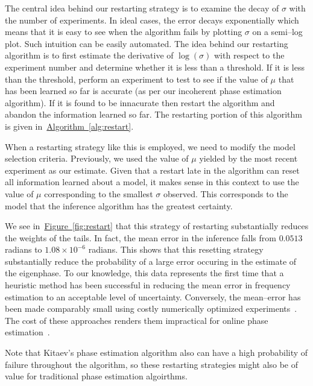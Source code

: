 \documentclass[aps,pra,amsmath,twocolumn,amssymb,superscriptaddress]{revtex4-1}
\newcommand{\fig}[1]{\hyperref[fig:#1]{Figure~\ref*{fig:#1}}}
\newcommand{\alg}[1]{\hyperref[alg:#1]{Algorithm~\ref*{alg:#1}}}
\begin{document}
The central idea behind our restarting strategy is to examine the decay of $\sigma$ with the number of experiments.  In ideal cases, the error decays exponentially which means that it is easy to see when the algorithm fails by plotting $\sigma$ on a semi--log plot.  Such intuition can be easily automated.  The idea behind our restarting algorithm is to first estimate the derivative of $\log(\sigma)$ with respect to the experiment number and determine whether it is less than a threshold.  If it is less than the threshold, perform an experiment to test to see if the value of $\mu$ that has been learned so far is accurate (as per our incoherent phase estimation algorithm).  If it is found to be innacurate then restart the algorithm and abandon the information learned so far.  The restarting portion of this algorithm is given in~\alg{restart}.

When a restarting strategy like this is employed, we need to modify the model selection criteria.  Previously, we used the value of $\mu$ yielded by the most recent experiment as our estimate.   Given that a restart late in the algorithm can reset all information learned about a model, it makes sense in this context to use the value of $\mu$ corresponding to the smallest $\sigma$ observed.  This corresponds to the model that the inference algorithm has the greatest certainty.

We see in~\fig{restart} that this strategy of restarting substantially reduces the weights of the tails.  In fact, the mean error in the inference falls from $0.0513$ radians to $1.08\times 10^{-6}$ radians.  This shows that this resetting strategy substantially reduce the probability of a large error occuring in the estimate of the eigenphase.  To our knowledge, this data represents the first time that a heuristic method has been successful in reducing the mean error in frequency estimation to an acceptable level of uncertainty.
Conversely,  the mean--error has been made comparably small using costly numerically optimized experiments~\cite{granade_robust_2012,ferrie_how_2013}.  The cost of these approaches renders them impractical for online phase estimation~\cite{granade_robust_2012,ferrie_how_2013, wiebe_hamiltonian_2014,wiebe_quantum_2014-1,WGC15}.

Note that Kitaev's phase estimation algorithm also can have a high probability of failure throughout the algorithm, so these restarting strategies might also be of value for traditional phase estimation algoirthms.  
\end{document}
